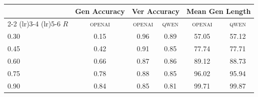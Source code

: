 \begin{tabular}{lccccc}
\toprule
  & \multicolumn{1}{c}{Gen Accuracy} & \multicolumn{2}{c}{Ver Accuracy} & \multicolumn{2}{c}{Mean Gen Length} \\
  \cmidrule(lr){2-2} \cmidrule(lr){3-4} \cmidrule(lr){5-6}
$R$ & \textsc{openai} & \textsc{openai} & \textsc{qwen} & \textsc{openai} & \textsc{qwen} \\
\midrule
0.30 & 0.15 & 0.96 & 0.89 & 57.05 & 57.12 \\
0.45 & 0.42 & 0.91 & 0.85 & 77.74 & 77.71 \\
0.60 & 0.66 & 0.87 & 0.86 & 89.12 & 88.73 \\
0.75 & 0.78 & 0.88 & 0.85 & 96.02 & 95.94 \\
0.90 & 0.84 & 0.85 & 0.81 & 99.71 & 99.87 \\
\bottomrule
\end{tabular}
